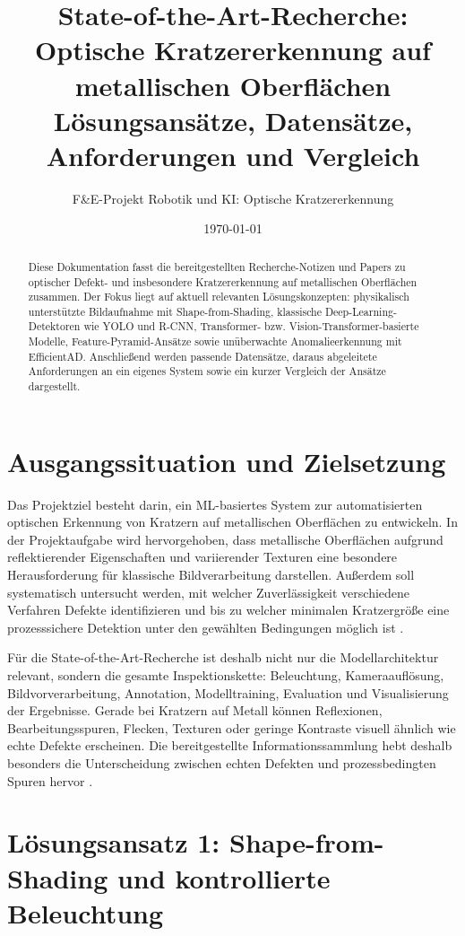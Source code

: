 \documentclass[11pt,a4paper]{article}
\title{\textbf{State-of-the-Art-Recherche: Optische Kratzererkennung auf metallischen Oberflächen}\\
\large Lösungsansätze, Datensätze, Anforderungen und Vergleich}
\author{F\&E-Projekt Robotik und KI: Optische Kratzererkennung}
\date{\today}
\begin{document}
\maketitle

\begin{abstract}
Diese Dokumentation fasst die bereitgestellten Recherche-Notizen und Papers zu optischer Defekt- und insbesondere Kratzererkennung auf metallischen Oberflächen zusammen. Der Fokus liegt auf aktuell relevanten Lösungskonzepten: physikalisch unterstützte Bildaufnahme mit Shape-from-Shading, klassische Deep-Learning-Detektoren wie YOLO und R-CNN, Transformer- bzw. Vision-Transformer-basierte Modelle, Feature-Pyramid-Ansätze sowie unüberwachte Anomalieerkennung mit EfficientAD. Anschließend werden passende Datensätze, daraus abgeleitete Anforderungen an ein eigenes System sowie ein kurzer Vergleich der Ansätze dargestellt.
\end{abstract}

\tableofcontents
\newpage

\section{Ausgangssituation und Zielsetzung}

Das Projektziel besteht darin, ein ML-basiertes System zur automatisierten optischen Erkennung von Kratzern auf metallischen Oberflächen zu entwickeln. In der Projektaufgabe wird hervorgehoben, dass metallische Oberflächen aufgrund reflektierender Eigenschaften und variierender Texturen eine besondere Herausforderung für klassische Bildverarbeitung darstellen. Außerdem soll systematisch untersucht werden, mit welcher Zuverlässigkeit verschiedene Verfahren Defekte identifizieren und bis zu welcher minimalen Kratzergröße eine prozesssichere Detektion unter den gewählten Bedingungen möglich ist \cite{projektaufgabe}. 

Für die State-of-the-Art-Recherche ist deshalb nicht nur die Modellarchitektur relevant, sondern die gesamte Inspektionskette: Beleuchtung, Kameraauflösung, Bildvorverarbeitung, Annotation, Modelltraining, Evaluation und Visualisierung der Ergebnisse. Gerade bei Kratzern auf Metall können Reflexionen, Bearbeitungsspuren, Flecken, Texturen oder geringe Kontraste visuell ähnlich wie echte Defekte erscheinen. Die bereitgestellte Informationssammlung hebt deshalb besonders die Unterscheidung zwischen echten Defekten und prozessbedingten Spuren hervor \cite{ersteinfos}. 

\section{Lösungsansatz 1: Shape-from-Shading und kontrollierte Beleuchtung}
\end{document}
